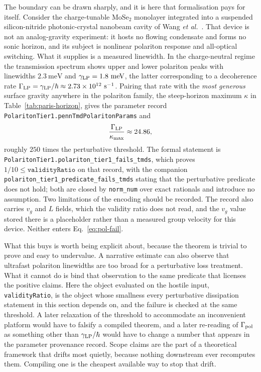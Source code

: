 \documentclass[aps,prd,reprint,nofootinbib,superscriptaddress]{revtex4-2}
\begin{document}
The boundary can be drawn sharply, and it is here that formalisation
pays for itself. Consider the charge-tunable MoSe$_2$ monolayer
integrated into a suspended silicon-nitride photonic-crystal nanobeam
cavity of Wang \emph{et al.}~\cite{Wang2026TMDPolariton}. That device is
not an analog-gravity experiment: it hosts no flowing condensate and
forms no sonic horizon, and its subject is nonlinear polariton response
and all-optical switching. What it supplies is a measured linewidth. In
the charge-neutral regime the transmission spectrum shows upper and
lower polariton peaks with linewidths $2.3~\mathrm{meV}$ and
$\gamma_{\rm LP} = 1.8~\mathrm{meV}$, the latter corresponding to a
decoherence rate
$\Gamma_{\rm LP} = \gamma_{\rm LP}/\hbar \approx
2.73\times10^{12}~\mathrm{s}^{-1}$. Pairing that rate with the
\emph{most generous} surface gravity anywhere in the polariton family,
the steep-horizon maximum $\kappa$ in Table~\ref{tab:paris-horizon}, gives the parameter record
\texttt{PolaritonTier1.pennTmdPolaritonParams} and
\begin{equation}
\frac{\Gamma_{\rm LP}}{\kappa_{\max}} \approx 24.86 ,
\label{eq:pol-fail}
\end{equation}
roughly $250$ times the perturbative threshold. The formal statement is
\texttt{PolaritonTier1.polariton\_tier1\_fails\_tmds}, which proves
$1/10 \leq \texttt{validityRatio}$ on that record, with the companion
\texttt{polariton\_tier1\_predicate\_fails\_tmds} stating that the
perturbative predicate does not hold; both are closed by
\texttt{norm\_num} over exact rationals and introduce no assumption. Two
limitations of the encoding should be recorded. The record also carries
$v_g$ and $L$ fields, which the validity ratio does not read, and the
$v_g$ value stored there is a placeholder rather than a measured group
velocity for this device. Neither enters Eq.~\eqref{eq:pol-fail}.

What this buys is worth being explicit about, because the theorem is
trivial to prove and easy to undervalue. A narrative estimate can also
observe that ultrafast polariton linewidths are too broad for a
perturbative loss treatment. What it cannot do is bind that observation
to the same predicate that licenses the positive claims. Here the object
evaluated on the hostile input, \texttt{validityRatio}, is the object
whose smallness every perturbative dissipation statement in this section
depends on, and the failure is checked at the same threshold. A later
relaxation of the threshold to accommodate an inconvenient platform
would have to falsify a compiled theorem, and a later re-reading of
$\Gamma_{\rm pol}$ as something other than $\gamma_{\rm LP}/\hbar$ would
have to change a number that appears in the parameter provenance record.
Scope claims are the part of a theoretical framework that drifts most
quietly, because nothing downstream ever recomputes them. Compiling one
is the cheapest available way to stop that drift.
\end{document}
